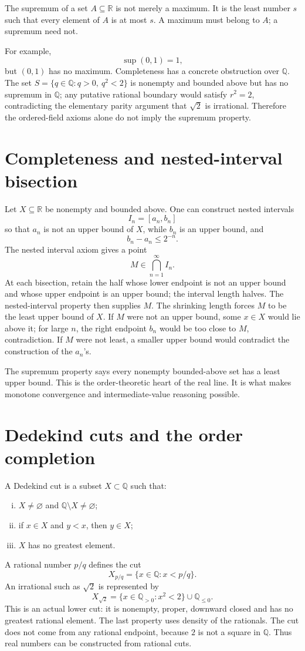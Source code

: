 The supremum of a set \(A\subseteq\mathbb R\) is not merely a maximum.  It is the least number \(s\) such that every element of \(A\) is at most \(s\).  A maximum must belong to \(A\); a supremum need not.

For example,
\[
  \sup(0,1)=1,
\]
but \((0,1)\) has no maximum.  Completeness has a concrete obstruction over \(\mathbb Q\). The set \(S=\{q\in\mathbb Q:q>0,\ q^2<2\}\) is nonempty and bounded above but has no supremum in \(\mathbb Q\); any putative rational boundary would satisfy \(r^2=2\), contradicting the elementary parity argument that \(\sqrt2\) is irrational. Therefore the ordered-field axioms alone do not imply the supremum property.

\section{Completeness and nested-interval bisection}

Let \(X\subseteq\mathbb R\) be nonempty and bounded above.  One can construct nested intervals
\[
  I_n=[a_n,b_n]
\]
so that \(a_n\) is not an upper bound of \(X\), while \(b_n\) is an upper bound, and
\[
  b_n-a_n\le 2^{-n}.
\]
The nested interval axiom gives a point
\[
  M\in\bigcap_{n=1}^{\infty}I_n.
\]
At each bisection, retain the half whose lower endpoint is not an upper bound and whose upper endpoint is an upper bound; the interval length halves. The nested-interval property then supplies \(M\). The shrinking length forces \(M\) to be the least upper bound of \(X\).  If \(M\) were not an upper bound, some \(x\in X\) would lie above it; for large \(n\), the right endpoint \(b_n\) would be too close to \(M\), contradiction.  If \(M\) were not least, a smaller upper bound would contradict the construction of the \(a_n\)'s.

The supremum property says every nonempty bounded-above set has a least upper bound.  This is the order-theoretic heart of the real line.  It is what makes monotone convergence and intermediate-value reasoning possible.

\section{Dedekind cuts and the order completion}

A Dedekind cut is a subset \(X\subset\mathbb Q\) such that:
\begin{enumerate}[(i)]
  \item \(X\neq\varnothing\) and \(\mathbb Q\setminus X\neq\varnothing\);
  \item if \(x\in X\) and \(y<x\), then \(y\in X\);
  \item \(X\) has no greatest element.
\end{enumerate}
A rational number \(p/q\) defines the cut
\[
  X_{p/q}=\{x\in\mathbb Q:x<p/q\}.
\]
An irrational such as \(\sqrt2\) is represented by
\[
  X_{\sqrt2}=\{x\in\mathbb Q_{>0}:x^2<2\}\cup\mathbb Q_{\le0}.
\]
This is an actual lower cut: it is nonempty, proper, downward closed and has no greatest rational element. The last property uses density of the rationals. The cut does not come from any rational endpoint, because \(2\) is not a square in \(\mathbb Q\). Thus real numbers can be constructed from rational cuts.

